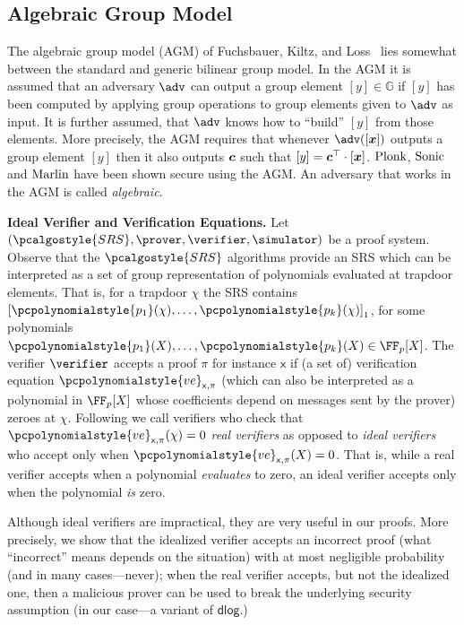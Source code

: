 \documentclass[10pt]{llncs}
\let\spvec\vec
\let\vec\accentvec
\let\spvec\vec
\let\vec\spvec
\def\vec#1{\mathchoice{\mbox{\boldmath$\displaystyle#1$}}
  {\mbox{\boldmath$\textstyle#1$}} {\mbox{\boldmath$\scriptstyle#1$}}
  {\mbox{\boldmath$\scriptscriptstyle#1$}}}
\newcommand{\SRScer}{\pcalgostyle{SRS}}
\renewcommand{\kgen}{\pcalgostyle{GenSRS}}
\newcommand{\pcvarstyle}[1]{\mathsf{#1}}
\newcommand{\GRP} {\mathbb{G}}
\newcommand{\p}[1]{\pcpolynomialstyle{#1}}
\newcommand{\bmap}[2] {\left[#1\right]_{#2}}
\newcommand{\gone}[1] {\bmap{#1}{1}}
\newcommand{\gnone}[1]{\left[#1\right]}
\newcommand{\zkproof}{\pi}
\newcommand{\inp}{\pcvarstyle{x}}
\newcommand{\vereq}{\p{ve}}
\newcommand{\com}{\pcalgostyle{Com}}
\newcommand{\op}{\pcalgostyle{Op}}
\newcommand{\open}{\op}
\renewcommand{\verify}{\pcalgostyle{Verify}}
\newcommand{\plonk}{\ensuremath{\textnormal{{Plonk}}}}
\newcommand{\marlin}{{\ensuremath{\textnormal{{Marlin}}}}}
\newcommand{\sonic}{{\ensuremath{\textnormal{{Sonic}}}}}
\newcommand{\dlog}{\pcvarstyle{dlog}}
\newcommand{\hamid}[2] {} %
\newcommand{\oursubsub}[1] {\smallskip\noindent\textbf{#1}}
\begin{document}
\subsection{Algebraic Group Model}
The algebraic group model (AGM) of Fuchsbauer, Kiltz, and Loss~\cite{C:FucKilLos18} lies somewhat between the
standard and generic bilinear group model. In the AGM it is assumed that an
adversary $\adv$ can output a group element $\gnone{y} \in \GRP$ if $\gnone{y}$ has
been computed by applying group operations to group elements given to $\adv$ as
input. It is further assumed, that $\adv$ knows how to ``build'' $\gnone{y}$ from
those elements. More precisely, the AGM requires that whenever $\adv(\gnone{\vec{x}})$
outputs a group element $\gnone{y}$ then it also outputs $\vec{c}$ such that
$\gnone{y} = \vec{c}^\top \cdot \gnone{\vec{x}}$. $\plonk$, $\sonic$ and $\marlin$
have been shown secure using the AGM. An adversary that works in the AGM is called
\emph{algebraic}.

\oursubsub{Ideal Verifier and Verification Equations.} Let
$(\SRScer, \prover, \verifier, \simulator)$ be a proof system.
Observe that the $\SRScer$ algorithms provide an SRS which can be interpreted as a set
of group representation of polynomials evaluated at trapdoor elements. That is, for a
trapdoor $\chi$ the SRS contains $\gone{\p{p_1}(\chi), \ldots, \p{p_k}(\chi)}$, for
some polynomials $\p{p_1}(X), \ldots, \p{p_k}(X) \in \FF_p[X]$. The verifier
$\verifier$ accepts a proof $\zkproof$ for instance $\inp$ if (a set of) verification
equation $\vereq_{\inp, \zkproof}$ (which can also be interpreted as a polynomial in
$\FF_p[X]$ whose coefficients depend on messages sent by the prover) zeroes at
$\chi$. Following \cite{EPRINT:GabWilCio19} we call verifiers who check that
$\vereq_{\inp, \zkproof}(\chi) = 0$ \emph{real verifiers} as opposed to \emph{ideal
	verifiers} who accept only when $\vereq_{\inp, \zkproof}(X) = 0$. That is, while a
real verifier accepts when a polynomial \emph{evaluates} to zero, an ideal verifier
accepts only when the polynomial \emph{is} zero.

Although ideal verifiers are impractical, they are very useful in our
proofs. More precisely, we show that
the idealized verifier accepts an incorrect proof (what ``incorrect''
means depends on the situation) with at most negligible probability (and in many
cases---never);
when the real verifier accepts, but not the idealized one, then a malicious
prover can be used to break the underlying security assumption (in our case---a
variant of $\dlog$.)
\end{document}

